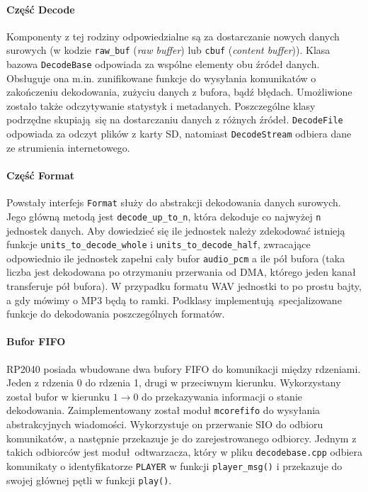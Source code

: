 \documentclass[polish]{aghengthesis}
\begin{document}
		
			\paragraph{Część Decode}
				Komponenty z tej rodziny odpowiedzialne są za dostarczanie nowych danych surowych (w kodzie \lstinline|raw_buf| (\textit{raw buffer}) lub \lstinline|cbuf| (\textit{content buffer})). Klasa bazowa \lstinline|DecodeBase| odpowiada za wspólne elementy obu źródeł danych. Obsługuje ona m.in. zunifikowane funkcje do wysyłania komunikatów o zakończeniu dekodowania, zużyciu danych z bufora, bądź błędach. Umożliwione zostało także odczytywanie statystyk i metadanych. Poszczególne klasy podrzędne skupiają się na dostarczaniu danych z różnych źródeł. \lstinline|DecodeFile| odpowiada za odczyt plików z karty SD, natomiast \lstinline|DecodeStream| odbiera dane ze strumienia internetowego.
			
			\paragraph{Część Format}
				Powstały interfejs \lstinline|Format| służy do abstrakcji dekodowania danych surowych. Jego główną metodą jest \lstinline|decode_up_to_n|, która dekoduje co najwyżej \lstinline|n| jednostek danych. Aby dowiedzieć się ile jednostek należy zdekodować istnieją funkcje \lstinline|units_to_decode_whole| i \lstinline|units_to_decode_half|, zwracające odpowiednio ile jednostek zapełni cały bufor \lstinline|audio_pcm| a ile pół bufora (taka liczba jest dekodowana po otrzymaniu przerwania od DMA, którego jeden kanał transferuje pół bufora). W przypadku formatu WAV jednostki to po prostu bajty, a gdy mówimy o MP3 będą to ramki. Podklasy implementują specjalizowane funkcje do dekodowania poszczególnych formatów.
			
			\paragraph{Bufor FIFO}
				RP2040 posiada wbudowane dwa bufory FIFO do komunikacji między rdzeniami. Jeden z rdzenia 0 do rdzenia 1, drugi w przeciwnym kierunku. Wykorzystany został bufor w kierunku $1 \rightarrow 0$ do przekazywania informacji o stanie dekodowania. Zaimplementowany został moduł \lstinline|mcorefifo| do wysyłania abstrakcyjnych wiadomości. Wykorzystuje on przerwanie SIO do odbioru komunikatów, a następnie przekazuje je do zarejestrowanego odbiorcy. Jednym z takich odbiorców jest moduł odtwarzacza, który w pliku \lstinline|decodebase.cpp| odbiera komunikaty o identyfikatorze \lstinline|PLAYER| w funkcji \lstinline|player_msg()| i przekazuje do swojej głównej pętli w funkcji \lstinline|play()|.
		
\end{document}
